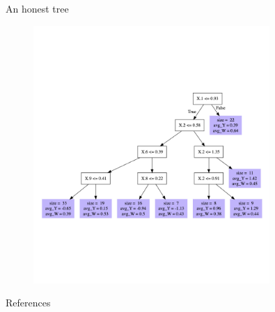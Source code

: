 \documentclass[xcolor={table}, handout]{beamer}
\begin{document}
\begin{frame}{An honest tree}

\begin{figure}
\centering
\includegraphics[width = 0.8\textwidth]{../assets/tree-plot.png}
\end{figure}
\hfill
\end{frame}





\backupbegin

\begin{frame}[allowframebreaks]{References}
    
    
\end{frame}
\backupend
\end{document}
